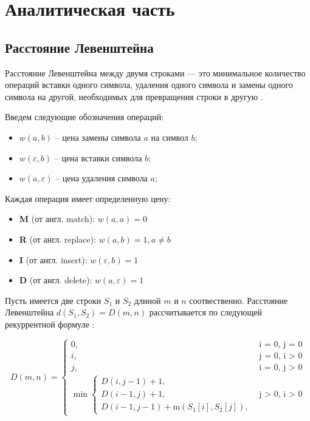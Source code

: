 \chapter{Аналитическая часть}

\section{Расстояние Левенштейна}

Расстояние Левенштейна между двумя строками --- это минимальное количество операций вставки одного символа, удаления одного символа и замены одного символа на другой, необходимых для превращения строки в другую \cite{analysis-lev-damlev}.

Введем следующие обозначения операций:
\begin{itemize}
    \item $w(a, b)$ -- цена замены символа $a$ на символ $b$;
    \item $w(\varepsilon, b)$ – цена вставки символа $b$; 
    \item $w(a, \varepsilon)$ – цена удаления символа $a$; 
\end{itemize}

Каждая операция имеет определенную цену:
\begin{itemize}
    \item \textbf{M} (от англ. match): $w(a, a) = 0$
    \item \textbf{R} (от англ. replace): $w(a, b) = 1, a \ne b$
    \item \textbf{I} (от англ. insert): $w(\varepsilon, b) = 1$
    \item \textbf{D} (от англ. delete): $w(a, \varepsilon) = 1$
\end{itemize}

Пусть имеется две строки $S_1$ и $S_2$ длиной $m$ и $n$ соотвественно. Расстояние Левенштейна $d(S_1, S_2) = D(m, n)$ рассчитывается по следу\-ющей рекуррентной формуле \cite{prog-impl-lev}:

\begin{equation}
    \label{eqn:recur-lev}
    D(m, n) =
    \begin{cases}
        0, &\text{i = 0, j = 0}\\
        i, &\text{j = 0, i > 0}\\
        j, &\text{i = 0, j > 0}\\
        \min
        \begin{cases}
            D(i, j - 1) + 1,\\
            D(i - 1, j) + 1,\\
            D(i - 1, j - 1) + \text{m}(S_1[i], S_2[j]),
        \end{cases} &\text{j > 0, i > 0}
    \end{cases}
\end{equation}

